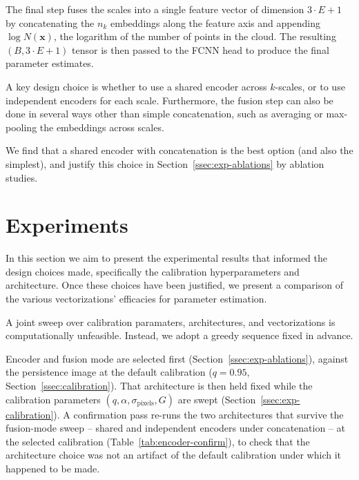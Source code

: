 \documentclass[11pt,letterpaper]{article}
\newcommand{\1}{\mathds{1}}
\newcommand{\pc}{\mathbf{x}}
\theoremstyle{plain}
\theoremstyle{definitioncolon}
\begin{document}
The final step fuses the scales into a single feature vector of dimension $3\cdot E + 1$
by concatenating the $n_k$ embeddings along the feature axis and appending $\log N(\pc)$,
the logarithm of the number of points in the cloud. The resulting $(B, 3\cdot E + 1)$ tensor
is then passed to the FCNN head to produce the final parameter estimates.

A key design choice is whether to use a shared encoder across $k$-scales, or to use independent encoders
for each scale. Furthermore, the fusion step can also be done in several ways other than simple concatenation,
such as averaging or max-pooling the embeddings across scales.

We find that a shared encoder with concatenation is the best option (and also the simplest), and justify
this choice in Section~\ref{ssec:exp-ablations} by ablation studies.



\section{Experiments}
\label{sec:experiments}

In this section we aim to present the experimental results that informed the
design choices made, specifically the calibration hyperparameters and architecture. 
Once these choices have been justified, we present a comparison
of the various vectorizations' efficacies for parameter estimation.

A joint sweep over calibration paramaters, architectures, and vectorizations 
is computationally unfeasible. Instead, we adopt a greedy sequence fixed in advance. 

Encoder and fusion mode are selected first
(Section~\ref{ssec:exp-ablations}), against the persistence image at the
default calibration ($q=0.95$, Section~\ref{ssec:calibration}). That
architecture is then held fixed while the calibration parameters
$(q,\alpha,\sigma_{\text{pixels}},G)$ are swept (Section~\ref{ssec:exp-calibration}).
A confirmation pass re-runs the two architectures that survive the fusion-mode
sweep -- shared and independent encoders under concatenation -- at the
selected calibration (Table~\ref{tab:encoder-confirm}), to check that the
architecture choice was not an artifact of the default calibration under which it
happened to be made.
\end{document}
